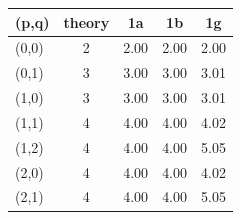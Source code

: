 \begin{tabular}{lcccc}
\toprule
(p,q) & theory & 1a & 1b & 1g \\
\midrule
(0,0) & 2 & 2.00 & 2.00 & 2.00 \\
(0,1) & 3 & 3.00 & 3.00 & 3.01 \\
(1,0) & 3 & 3.00 & 3.00 & 3.01 \\
(1,1) & 4 & 4.00 & 4.00 & 4.02 \\
(1,2) & 4 & 4.00 & 4.00 & 5.05 \\
(2,0) & 4 & 4.00 & 4.00 & 4.02 \\
(2,1) & 4 & 4.00 & 4.00 & 5.05 \\
\bottomrule
\end{tabular}
